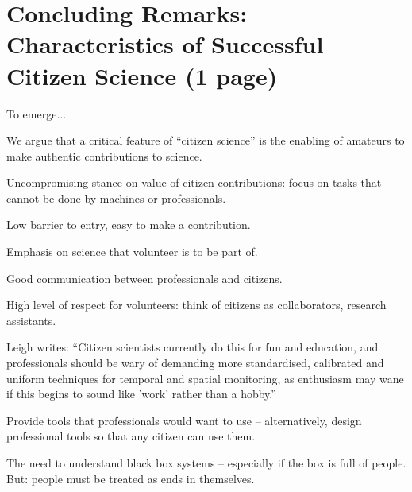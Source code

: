 \documentclass{ar2e}
\begin{document}


\section{Concluding Remarks: Characteristics of Successful Citizen Science (1 page)}
\label{sec:conclusions}


To emerge...

We argue that a critical feature of ``citizen science'' is the enabling of 
amateurs to make authentic contributions to science. 

Uncompromising stance on value of citizen contributions: focus on tasks that
cannot be done by machines or professionals.

Low barrier to entry, easy to make a contribution.

Emphasis on science that volunteer is to be part of. 

Good communication between professionals and citizens.

High level of respect for volunteers: think of citizens as collaborators,
research assistants.

Leigh writes: ``Citizen
scientists currently do this for fun and education, and professionals should
be wary of demanding more standardised, calibrated and uniform techniques for
temporal and spatial monitoring, as enthusiasm may wane if this begins to
sound like 'work' rather than a hobby.''

Provide tools that professionals would want to use -- alternatively, design
professional tools so that any citizen can use them.

The need to understand black box systems -- especially if the box is full of
people. But: people must be treated as ends in themselves. 

\end{document}
